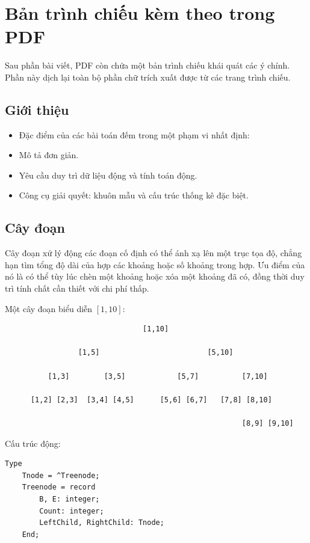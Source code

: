 \documentclass[11pt]{article}
\begin{document}
\appendix
\section{Bản trình chiếu kèm theo trong PDF}

Sau phần bài viết, PDF còn chứa một bản trình chiếu khái quát các ý chính. Phần
này dịch lại toàn bộ phần chữ trích xuất được từ các trang trình chiếu.

\subsection{Giới thiệu}

\begin{itemize}
  \item Đặc điểm của các bài toán đếm trong một phạm vi nhất định:
  \item Mô tả đơn giản.
  \item Yêu cầu duy trì dữ liệu động và tính toán động.
  \item Công cụ giải quyết: khuôn mẫu và cấu trúc thống kê đặc biệt.
\end{itemize}

\subsection{Cây đoạn}

Cây đoạn xử lý động các đoạn cố định có thể ánh xạ lên một trục tọa độ, chẳng
hạn tìm tổng độ dài của hợp các khoảng hoặc số khoảng trong hợp. Ưu điểm của
nó là có thể tùy lúc chèn một khoảng hoặc xóa một khoảng đã có, đồng thời duy
trì tính chất cần thiết với chi phí thấp.

Một cây đoạn biểu diễn \([1,10]\):

\begin{verbatim}
                                [1,10]

                 [1,5]                         [5,10]

          [1,3]        [3,5]            [5,7]          [7,10]

      [1,2] [2,3]  [3,4] [4,5]      [5,6] [6,7]   [7,8] [8,10]

                                                       [8,9] [9,10]
\end{verbatim}

Cấu trúc động:

\begin{verbatim}
Type
    Tnode = ^Treenode;
    Treenode = record
        B, E: integer;
        Count: integer;
        LeftChild, RightChild: Tnode;
    End;
\end{verbatim}
\end{document}

